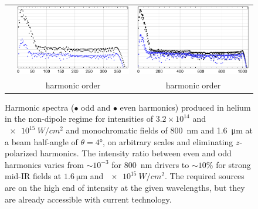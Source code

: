 {\begin{figure}[p]
\begin{tabular}{ccc}
    &
 \includegraphics[height=\figureNineEheight]{9-Nondipole-HHG/Figures/figure9Ec.pdf}
    & 
 \includegraphics[height=\figureNineEheight]{9-Nondipole-HHG/Figures/figure9Ed.pdf}
   \\[2mm]
    & harmonic order & harmonic order 
  \end{tabular}
  \caption[
  Harmonic spectra for reasonable fields at $\SI{800}{nm}$ and $\SI{1.6}{\micro\metre}$, and intensities $3.2\times 10^{14}$ and $\SI{e15}{W/cm^2}$, showing measurable even-harmonics signals for non-collinear beams
  ]{
  Harmonic spectra ($\bullet$ odd and {\color{blue!80}$\bullet$} even harmonics) produced in helium in the non-dipole regime for intensities of $3.2\times 10^{14}$ and $\SI{e15}{W/cm^2}$ and monochromatic fields of \SI{800}{nm} and \SI{1.6}{\micro\metre} at a beam half-angle of $\theta=4\si{\degree}$, on arbitrary scales and eliminating $z$-polarized harmonics. The intensity ratio between even and odd harmonics varies from ${\sim}10^{-3}$ for \SI{800}{nm} drivers to ${\sim}10\%$ for strong mid-IR fields at $\SI{1.6}{\micro\metre}$ and $\SI{e15}{W/cm^2}$. The required sources are on the high end of intensity at the given wavelengths, but they are already accessible with current technology.
  }
\label{f9-even-harmonics-spectra}
\end{figure}
}


